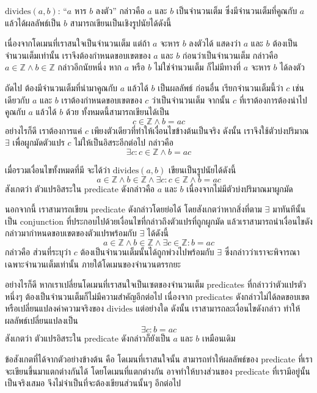 \begin{example}
$\mathrm{divides}(a,b)$: ``$a$ หาร $b$ ลงตัว'' กล่าวคือ $a$ และ $b$ เป็นจำนวนเต็ม ซึ่งมีจำนวนเต็มที่คูณกับ $a$ แล้วได้ผลลัพธ์เป็น $b$ สามารถเขียนเป็นเชิงรูปนัยได้ดังนี้

เนื่องจากโดเมนที่เราสนใจเป็นจำนวนเต็ม แต่ถ้า $a$ จะหาร $b$ ลงตัวได้ แสดงว่า $a$ และ $b$ ต้องเป็นจำนวนเต็มเท่านั้น เราจึงต้องกำหนดขอบเขตของ $a$ และ $b$ ก่อนว่าเป็นจำนวนเต็ม กล่าวคือ $a\in\mathbb{Z}\wedge b\in\mathbb{Z}$ \enskip กล่าวอีกนัยหนึ่ง หาก $a$ หรือ $b$ ไม่ใช่จำนวนเต็ม ก็ไม่มีทางที่ $a$ จะหาร $b$ ได้ลงตัว

ถัดไป ต้องมีจำนวนเต็มที่นำมาคูณกับ $a$ แล้วได้ $b$ เป็นผลลัพธ์ \enskip ก่อนอื่น เรียกจำนวนเต็มนี้ว่า $c$ \enskip เช่นเดียวกับ $a$ และ $b$ เราต้องกำหนดขอบเขตของ $c$ ว่าเป็นจำนวนเต็ม \enskip จากนั้น $c$ ที่เราต้องการต้องนำไปคูณกับ $a$ แล้วได้ $b$ ด้วย \enskip ทั้งหมดนี้สามารถเขียนได้เป็น \[c\in\mathbb{Z}\wedge b=ac\] อย่างไรก็ดี เราต้องการแค่ $c$ เพียงตัวเดียวที่ทำให้เงื่อนไขข้างต้นเป็นจริง ดังนั้น เราจึงใช้ตัวบ่งปริมาณ $\exists$ เพื่อผูกมัดตัวแปร $c$ ไม่ให้เป็นอิสระอีกต่อไป กล่าวคือ \[\exists c:c\in\mathbb{Z}\wedge b=ac\]

เมื่อรวมเงื่อนไขทั้งหมดที่มี จะได้ว่า $\mathrm{divides}(a,b)$ เขียนเป็นรูปนัยได้ดังนี้ \[a\in\mathbb{Z}\wedge b\in\mathbb{Z}\wedge\exists c:c\in\mathbb{Z}\wedge b=ac\] สังเกตว่า ตัวแปรอิสระใน predicate ดังกล่าวคือ $a$ และ $b$ เนื่องจากไม่มีตัวบ่งปริมาณมาผูกมัด

นอกจากนี้ เราสามารถเขียน predicate ดังกล่าวโดยย่อได้ โดยสังเกตว่าหากสิ่งที่ตาม $\exists$ มาทันทีนั้นเป็น conjunction ที่ประกอบไปด้วยเงื่อนไขที่กล่าวถึงตัวแปรที่ถูกผูกมัด แล้วเราสามารถนำเงื่อนไขดังกล่าวมากำหนดขอบเขตของตัวแปรพร้อมกับ $\exists$ ได้ดังนี้
\[a\in\mathbb{Z}\wedge b\in\mathbb{Z}\wedge\exists c\in\mathbb{Z}: b=ac\]
กล่าวคือ ส่วนที่ระบุว่า $c$ ต้องเป็นจำนวนเต็มนั้นได้ถูกพ่วงไปพร้อมกับ $\exists$ ซึ่งกล่าวว่าเราจะพิจารณาเฉพาะจำนวนเต็มเท่านั้น ภายใต้โดเมนของจำนวนตรรกยะ

อย่างไรก็ดี หากเราเปลี่ยนโดเมนที่เราสนใจเป็นเซตของจำนวนเต็ม predicates ที่กล่าวว่าตัวแปรตัวหนึ่งๆ ต้องเป็นจำนวนเต็มก็ไม่มีความสำคัญอีกต่อไป เนื่องจาก predicates ดังกล่าวไม่ได้ลดขอบเขตหรือเปลี่ยนแปลงค่าความจริงของ $\mathrm{divides}$ แต่อย่างใด \enskip ดังนั้น เราสามารถละเงื่อนไขดังกล่าว ทำให้ผลลัพธ์เปลี่ยนแปลงเป็น \[\exists c: b=ac\] สังเกตว่า ตัวแปรอิสระใน predicate ดังกล่าวก็ยังเป็น $a$ และ $b$ เหมือนเดิม
\end{example}
ข้อสังเกตที่ได้จากตัวอย่างข้างต้น คือ โดเมนที่เราสนใจนั้น สามารถทำให้ผลลัพธ์ของ predicate ที่เราจะเขียนขึ้นมาแตกต่างกันได้ โดยโดเมนที่แตกต่างกัน อาจทำให้บางส่วนของ predicate ที่เรามีอยู่นั้นเป็นจริงเสมอ จึงไม่จำเป็นที่จะต้องเขียนส่วนนั้นๆ อีกต่อไป

